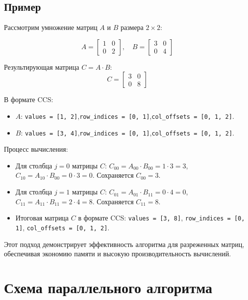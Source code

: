 \documentclass[12pt]{extarticle}
\begin{document}
\subsection{Пример}

\hspace*{1.25cm}Рассмотрим умножение матриц $A$ и $B$ размера $2 \times 2$:

\[
A = \begin{bmatrix}
1 & 0 \\
0 & 2
\end{bmatrix}, \quad
B = \begin{bmatrix}
3 & 0 \\
0 & 4
\end{bmatrix}
\]

Результирующая матрица $C = A \cdot B$:
\[
C = \begin{bmatrix}
3 & 0 \\
0 & 8
\end{bmatrix}
\]

В формате CCS:
\begin{itemize}
    \item $A$: \texttt{values = [1, 2]},\texttt{row\_indices = [0, 1]},\texttt{col\_offsets = [0, 1, 2]}.
    \item $B$: \texttt{values = [3, 4]},\texttt{row\_indices = [0, 1]},\texttt{col\_offsets = [0, 1, 2]}.
\end{itemize}

Процесс вычисления:
\begin{itemize}
    \item Для столбца $j=0$ матрицы $C$: $C_{00} = A_{00} \cdot B_{00} = 1 \cdot 3 = 3$, $C_{10} = A_{10} \cdot B_{00} = 0 \cdot 3 = 0$. Сохраняется $C_{00} = 3$.
    \item Для столбца $j=1$ матрицы $C$: $C_{01} = A_{01} \cdot B_{11} = 0 \cdot 4 = 0$, $C_{11} = A_{11} \cdot B_{11} = 2 \cdot 4 = 8$. Сохраняется $C_{11} = 8$.
    \item Итоговая матрица $C$ в формате CCS: \texttt{values = [3, 8]}, \texttt{row\_indices = [0, 1]}, \texttt{col\_offsets = [0, 1, 2]}.
\end{itemize}

Этот подход демонстрирует эффективность алгоритма для разреженных матриц, обеспечивая экономию памяти и высокую производительность вычислений.

\section{Схема параллельного алгоритма}
\end{document}
